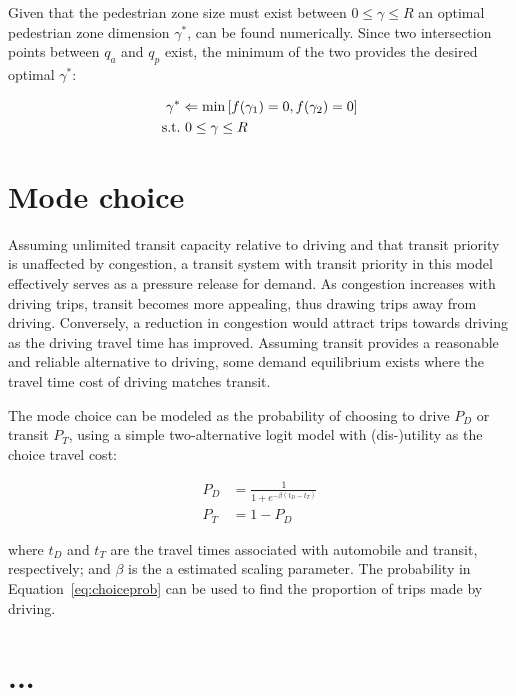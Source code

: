 \documentclass{article}
\begin{document}
Given that the pedestrian zone size must exist between $0 \leq \gamma \leq R$ an optimal pedestrian zone dimension $\gamma^*$, can be found numerically. Since two intersection points between $q_a$ and $q_p$ exist, the minimum of the two provides the desired optimal $\gamma^*$:

\begin{align}\small
\gamma^* &\Leftarrow \text{min} \left[ f(\gamma_1) = 0, f(\gamma_2) = 0 \right]\\
\text{s.t.} & ~ 0 \leq \gamma \leq R 
\end{align}


\section{Mode choice}
Assuming unlimited transit capacity relative to driving and that transit priority is unaffected by congestion, a transit system with transit priority in this model effectively serves as a pressure release for demand. As congestion increases with driving trips, transit becomes more appealing, thus drawing trips away from driving. Conversely, a reduction in congestion would attract trips towards driving as the driving travel time has improved. Assuming transit provides a reasonable and reliable alternative to driving, some demand equilibrium exists where the travel time cost of driving matches transit.

The mode choice can be modeled as the probability of choosing to drive $P_D$ or transit $P_T$, using a simple two-alternative logit model with (dis-)utility as the choice travel cost:

\begin{subequations}
    \label{eq:choiceprob}
    \begin{align}
        P_D & = \frac{1}{1+e^{-\beta (t_D-t_T)}}\\
        P_T & = 1 - P_D
    \end{align}
\end{subequations}

\noindent where $t_D$ and $t_T$ are the travel times associated with automobile and transit, respectively; and $\beta$ is the a estimated scaling parameter. The probability in Equation~\eqref{eq:choiceprob} can be used to find the proportion of trips made by driving.


\section{...}
\end{document}
